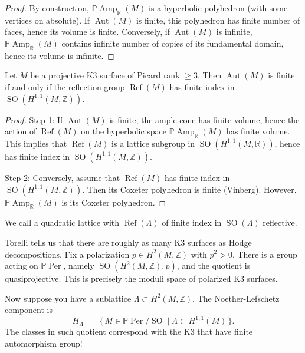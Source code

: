 \begin{proof}
By construction,
$\mathbb{P}\operatorname{Amp}_{\mathbb{R}}(M)$ is a
hyperbolic polyhedron (with some vertices on
absolute). If $\operatorname{Aut}(M)$ is finite, this
polyhedron has finite number of faces, hence its
volume is finite. Conversely, if $\operatorname{Aut}(M)$
is infinite, $\mathbb{P}\operatorname{Amp}_{\mathbb{R}}(M)$
contains infinite number of copies of its fundamental
domain, hence its volume is infinite.
\end{proof}

\begin{theorem}[Vinberg]
Let $M$ be a projective K3 surface of
Picard rank $\geq 3$. Then $\operatorname{Aut}(M)$
is finite if and only if the reflection group
$\operatorname{Ref}(M)$ has finite index in
$\operatorname{SO}(H^{1,1}(M,\mathbb{Z}))$.
\end{theorem}

\begin{proof}
Step 1: If $\operatorname{Aut}(M)$ is finite, the
ample cone has finite volume, hence the action of
$\operatorname{Ref}(M)$ on the hyperbolic space
$\mathbb{P}\operatorname{Amp}_{\mathbb{R}}(M)$ has
finite volume. This implies that $\operatorname{Ref}(M)$
is a lattice subgroup in
$\operatorname{SO}(H^{1,1}(M,\mathbb{R}))$, hence has
finite index in $\operatorname{SO}(H^{1,1}(M,\mathbb{Z}))$.

Step 2: Conversely, assume that $\operatorname{Ref}(M)$
has finite index in $\operatorname{SO}(H^{1,1}(M,\mathbb{Z}))$.
Then its Coxeter polyhedron is finite (Vinberg).
However, $\mathbb{P}\operatorname{Amp}_{\mathbb{R}}(M)$
is its Coxeter polyhedron.
\end{proof}

\begin{definition}
\label{definition-reflective}
We call a quadratic lattice with
$\operatorname{Ref}(\Lambda)$ of finite index in
$\operatorname{SO}(\Lambda)$ reflective.
\end{definition}

\noindent
Torelli tells us that there are roughly as many
K3 surfaces as Hodge decompositions. Fix a
polarization $p \in H^2(M,\mathbb{Z})$ with
$p^2>0$. There is a group acting on
$\mathbb{P}\operatorname{Per}$, namely
$\operatorname{SO}(H^2(M,\mathbb{Z}),p)$, and the
quotient is quasiprojective. This is precisely the
moduli space of polarized K3 surfaces.

\noindent
Now suppose you have a sublattice
$\Lambda \subset H^2(M,\mathbb{Z})$. The
Noether-Lefschetz component is
\[
H_{\Lambda}
\;=\;
\{\,M \in \mathbb{P}\operatorname{Per}/\operatorname{SO}
\mid \Lambda \subset H^{1,1}(M)\,\}.
\]
The classes in such quotient correspond
with the K3 that have finite automorphism
group!

